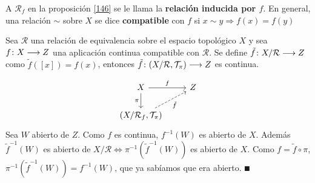 \documentclass[GTS.tex]{subfiles}
\begin{document}
\begin{defi} A $\mathcal{R}_f$ en la proposición \ref{146} se le llama la \textbf{relación inducida por $f$}. En general, una relación $\sim$ sobre $X$ se dice \textbf{compatible} con $f$ si $x\sim y\Rightarrow f(x)=f(y)$
\end{defi}

\begin{prop}\label{149}
Sea $\mathcal{R}$ una relación de equivalencia sobre el espacio topológico $X$ y sea $f\colon{X}\longrightarrow{Z}$ una aplicación continua compatible con $\mathcal{R}$. Se define $\tilde{f}\colon{X/\mathcal{R}}\longrightarrow{Z}$ como $\tilde{f}([x])=f(x)$, entonces $\tilde{f}\colon{(X/\mathcal{R},\mathcal{T}_\pi)}\longrightarrow{Z}$ es continua.
\end{prop}
\begin{dem}
\[
\begin{tikzcd}
X \ar[r, "f"]\arrow[d,"\pi "'] & Z\\
\left(X/\mathcal{R}_f,\Tau_\pi\right) \arrow[ur, dashrightarrow, "\tilde{f} "']
\end{tikzcd}
\]
Sea $W$ abierto de $Z$. Como $f$ es continua, $f^{-1}(W)$ es abierto de $X$. Además $\tilde{f}^{-1}(W)$ es abierto de $X/\mathcal{R}\Leftrightarrow\pi^{-1}(\tilde{f}^{-1}(W))$ es abierto de $X$. Como $f=\tilde{f}\circ\pi$, $\pi^{-1}(\tilde{f}^{-1}(W))=f^{-1}(W)$, que ya sabíamos que era abierto. $\QED$
\end{dem}
\end{document}
